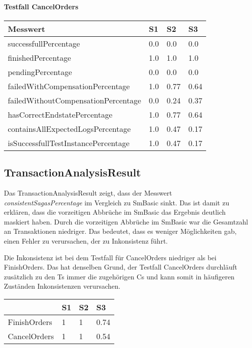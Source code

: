 \paragraph*{Testfall CancelOrders}
\begin{center}
	\fontsize{9}{12}\selectfont
	\begin{longtable}[h]{|p{5cm}|p{1cm}|p{1cm}|p{1cm}|}
		\hline
		Messwert & S1 & S2 & S3 \\ \hline
		\endhead
		\endfoot
		successfull\-Percentage & 0.0 & 0.0 & 0.0 \\ \hline
		finished\-Percentage & 1.0 & 1.0 & 1.0 \\ \hline
		pending\-Percentage & 0.0 & 0.0 & 0.0 \\ \hline
		failedWithCompensation\-Percentage & 1.0 & 0.77 & 0.64 \\ \hline
		failedWithoutCompensation\-Percentage & 0.0 & 0.24 & 0.37 \\ \hline
		hasCorrectEndstate\-Percentage & 1.0 & 0.77 & 0.64 \\ \hline
		containsAllExpectedLogs\-Percentage & 1.0 & 0.47 & 0.17 \\ \hline
		isSuccessfullTestInstance\-Percentage & 1.0 & 0.47 & 0.17 \\ \hline
	\end{longtable}
\end{center}
\FloatBarrier

\subsection{TransactionAnalysisResult}
Das TransactionAnalysisResult zeigt, dass der Messwert \textit{consistentSagasPercentage} im Vergleich zu SmBasic sinkt. Das ist damit zu erklären, dass die vorzeitigen Abbrüche im SmBasic das Ergebnis deutlich maskiert haben. Durch die vorzeitigen Abbrüche im SmBasic war die Gesamtzahl an Transaktionen niedriger. Das bedeutet, dass es weniger Möglichkeiten gab, einen Fehler zu verursachen, der zu Inkonsistenz führt.

Die Inkonsistenz ist bei dem Testfall für CancelOrders niedriger als bei FinishOrders. Das hat denselben Grund, der Testfall CancelOrders durchläuft zusätzlich zu den Ts immer die zugehörigen Cs und kann somit in häufigeren Zuständen Inkonsistenzen verursachen.

\begin{center}
	\fontsize{9}{12}\selectfont
	\begin{longtable}[h]{|p{5cm}|p{1cm}|p{1cm}|p{1cm}|}
		\hline
		& S1 & S2 & S3 \\ \hline
		\endhead
		\endfoot
		FinishOrders & 1 & 1 & 0.74\\ \hline	
		CancelOrders & 1 & 1 & 0.54\\ \hline
	\end{longtable}
\end{center}
\FloatBarrier